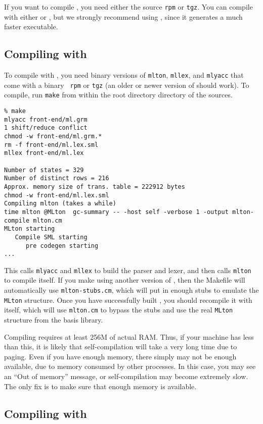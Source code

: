 
If you want to compile {\mlton}, you need either the source {\tt rpm}
or {\tt tgz}.  You can compile with either {\mlton} or {\smlnj}, but
we strongly recommend using {\mlton}, since it generates a much faster
executable.

\subsection{Compiling with {\mlton}}

To compile with {\mlton}, you need binary versions of {\tt mlton},
{\tt mllex}, and {\tt mlyacc} that come with a {\mlton} binary {\tt
rpm} or {\tt tgz} (an older or newer version of {\mlton} should work).
To compile, run {\tt make} from within the root directory directory of the
sources.
\begin{verbatim}
% make
mlyacc front-end/ml.grm
1 shift/reduce conflict
chmod -w front-end/ml.grm.*
rm -f front-end/ml.lex.sml
mllex front-end/ml.lex

Number of states = 329
Number of distinct rows = 216
Approx. memory size of trans. table = 222912 bytes
chmod -w front-end/ml.lex.sml
Compiling mlton (takes a while)
time mlton @MLton  gc-summary -- -host self -verbose 1 -output mlton-compile mlton.cm
MLton starting
   Compile SML starting
      pre codegen starting
...
\end{verbatim}
This calls {\tt mlyacc} and {\tt mllex} to build the parser and lexer, and then
calls {\tt mlton} to compile itself.  If you make {\mlton} using another version
of {\mlton}, then the Makefile will automatically use {\tt mlton-stubs.cm},
which will put in enough stubs to emulate the {\tt MLton} structure.  Once you
have successfully built {\mlton}, you should recompile it with itself, which
will use {\tt mlton.cm} to bypass the stubs and use the real {\tt MLton}
structure from the basis library.

Compiling {\mlton} requires at least 256M of actual RAM.  Thus, if your machine
has less than this, it is likely that self-compilation will take a very long
time due to paging.  Even if you have enough memory, there simply may not be
enough available, due to memory consumed by other processes.  In this case, you
may see an ``Out of memory'' message, or self-compilation may become extremely
slow.  The only fix is to make sure that enough memory is available.

\subsection{Compiling with {\smlnj}}


